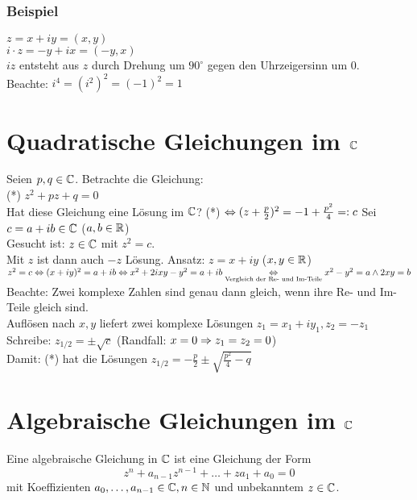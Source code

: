 \subsubsection*{Beispiel}
$z=x+iy=(x,y)$\\
$i \cdot z=-y+ix=(-y,x)$\\
$iz$ entsteht aus $z$ durch Drehung um $90^{\circ}$ gegen den Uhrzeigersinn um $0$.\\
Beachte: $i^4 = (i^2)^2 = (-1)^2 = 1$

\newpage

{}
\section*{Quadratische Gleichungen im $\mathbb{C}$}
Seien $p,q \in \mathbb{C}$. Betrachte die Gleichung:\\
(*) $z^2+pz+q=0$\\
Hat diese Gleichung eine Lösung im $\mathbb{C}$? (*) $\Leftrightarrow (z+\frac{p}{2})^2 = -1+\frac{p^2}{4} =: c$\nl
Sei $c=a+ib \in \mathbb{C}$ ($a,b \in \mathbb{R}$)\\
Gesucht ist: $z \in \mathbb{C}$ mit $z^2=c$.\\
Mit $z$ ist dann auch $-z$ Lösung.\nl
Ansatz: $z=x+iy$ ($x,y \in \mathbb{R}$)\\
$z^2 = c \Leftrightarrow (x+iy)^2 = a+ib \Leftrightarrow x^2+2ixy-y^2 = a+ib \underset{\text{Vergleich der Re- und Im-Teile}}{\Leftrightarrow} x^2-y^2=a \wedge 2xy = b$\nl
Beachte: Zwei komplexe Zahlen sind genau dann gleich, wenn ihre Re- und Im-Teile gleich sind.\\
Auflösen nach $x,y$ liefert zwei komplexe Lösungen $z_1=x_1+iy_1, z_2=-z_1$\\
Schreibe: $z_{1/2} = \pm \sqrt{c}$ (Randfall: $x=0 \Rightarrow z_1=z_2=0$)\\
Damit: (*) hat die Lösungen $z_{1/2} = - \frac{p}{2} \pm \sqrt{\frac{p^2}{4} - q}$

{}
\section*{Algebraische Gleichungen im $\mathbb{C}$}
Eine algebraische Gleichung in $\mathbb{C}$ ist eine Gleichung der Form
$$z^n + a_{n-1}z^{n-1}+ \ldots +za_1+a_0=0$$
mit Koeffizienten $a_0,\ldots,a_{n-1} \in \mathbb{C}, n \in \mathbb{N}$ und unbekanntem $z \in \mathbb{C}$.

